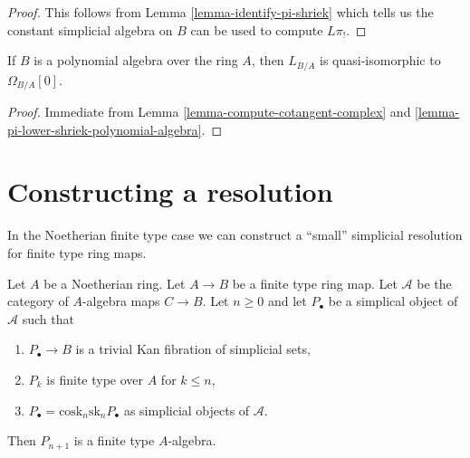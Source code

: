 \begin{proof}
This follows from Lemma \ref{lemma-identify-pi-shriek} which tells us
the constant simplicial algebra on $B$ can be used to compute $L\pi_!$.
\end{proof}

\begin{lemma}
\label{lemma-cotangent-complex-polynomial-algebra}
If $B$ is a polynomial algebra over the ring $A$, then
$L_{B/A}$ is quasi-isomorphic to $\Omega_{B/A}[0]$.
\end{lemma}

\begin{proof}
Immediate from
Lemma \ref{lemma-compute-cotangent-complex} and
\ref{lemma-pi-lower-shriek-polynomial-algebra}.
\end{proof}





\section{Constructing a resolution}
\label{section-polynomial}

\noindent
In the Noetherian finite type case we can construct a ``small'' simplicial
resolution for finite type ring maps.

\begin{lemma}
\label{lemma-polynomial}
Let $A$ be a Noetherian ring. Let $A \to B$ be a finite type ring map.
Let $\mathcal{A}$ be the category of $A$-algebra maps $C \to B$. Let
$n \geq 0$ and let $P_\bullet$ be a simplical object of $\mathcal{A}$
such that
\begin{enumerate}
\item $P_\bullet \to B$ is a trivial Kan fibration of simplicial sets,
\item $P_k$ is finite type over $A$ for $k \leq n$,
\item $P_\bullet = \text{cosk}_n \text{sk}_n P_\bullet$ as simplicial
objects of $\mathcal{A}$.
\end{enumerate}
Then $P_{n + 1}$ is a finite type $A$-algebra.
\end{lemma}

